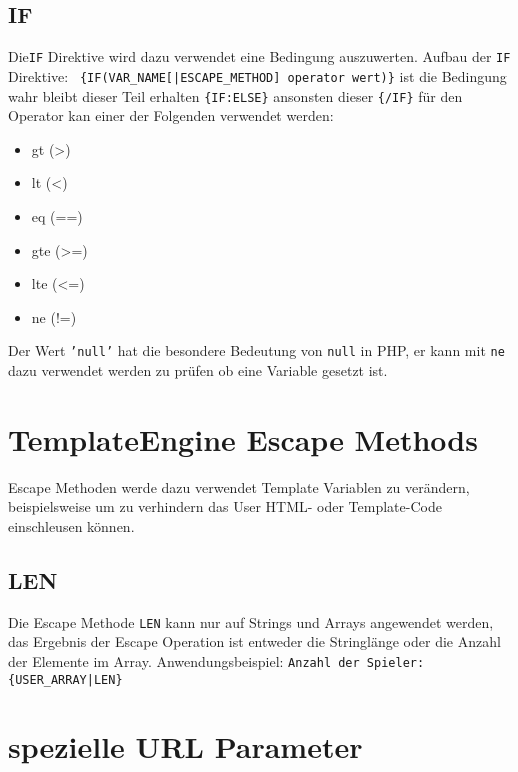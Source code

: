 \documentclass[a4paper,10pt]{article}
\begin{document}
\subsection{IF}
Die{\tt IF} Direktive wird dazu verwendet eine Bedingung auszuwerten.
Aufbau der {\tt IF} Direktive:\newline
{\tt
\{IF(VAR\_NAME[|ESCAPE\_METHOD] operator wert)\}}\newline
 ist die Bedingung wahr bleibt dieser Teil erhalten\newline
 {\tt \{IF:ELSE\}}\newline
 ansonsten dieser\newline
{\tt \{/IF\}}\newline
f\"ur den Operator kan einer der Folgenden verwendet werden:
\begin{itemize}
  \item gt (\textgreater)
  \item lt (\textless)
  \item eq (==)
  \item gte (\textgreater=)
  \item lte (\textless=)
  \item ne (!=)
\end{itemize}
Der Wert {\tt 'null'} hat die besondere Bedeutung von {\tt null} in PHP,
er kann mit {\tt ne} dazu verwendet werden zu pr\"ufen ob eine Variable gesetzt ist.

\section{TemplateEngine Escape Methods}
Escape Methoden werde dazu verwendet Template Variablen zu ver\"andern, beispielsweise
um zu verhindern das User HTML- oder Template-Code einschleusen k\"onnen.

\subsection{LEN}
Die Escape Methode {\tt LEN} kann nur auf Strings und Arrays angewendet werden, das
Ergebnis der Escape Operation ist entweder die Stringl\"ange oder die Anzahl der
Elemente im Array.\newline
Anwendungsbeispiel:\newline
{\tt Anzahl der Spieler: \{USER\_ARRAY|LEN\}}

\section{spezielle URL Parameter}
\end{document}
